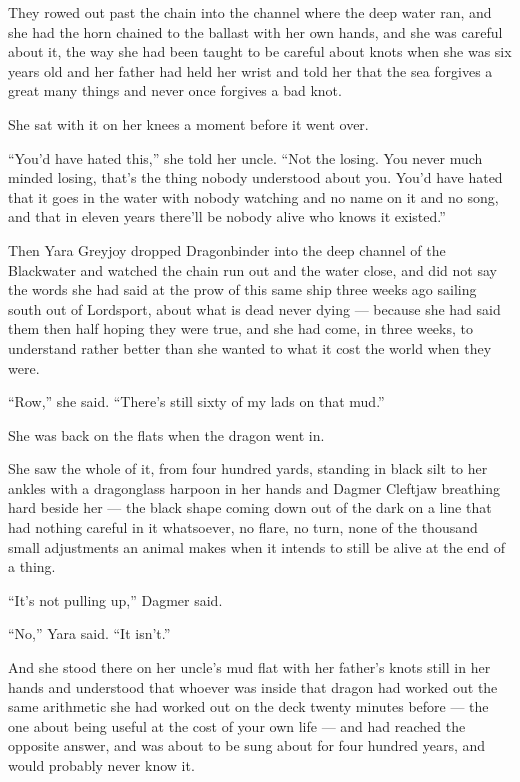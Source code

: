They rowed out past the chain into the channel where the deep water ran, and she had the horn chained to the ballast with her own hands, and she was careful about it, the way she had been taught to be careful about knots when she was six years old and her father had held her wrist and told her that the sea forgives a great many things and never once forgives a bad knot.

She sat with it on her knees a moment before it went over.

“You’d have hated this,” she told her uncle. “Not the losing. You never much minded losing, that’s the thing nobody understood about you. You’d have hated that it goes in the water with nobody watching and no name on it and no song, and that in eleven years there’ll be nobody alive who knows it existed.”

Then Yara Greyjoy dropped Dragonbinder into the deep channel of the Blackwater and watched the chain run out and the water close, and did not say the words she had said at the prow of this same ship three weeks ago sailing south out of Lordsport, about what is dead never dying — because she had said them then half hoping they were true, and she had come, in three weeks, to understand rather better than she wanted to what it cost the world when they were.

“Row,” she said. “There’s still sixty of my lads on that mud.”

\sceneBreak

She was back on the flats when the dragon went in.

She saw the whole of it, from four hundred yards, standing in black silt to her ankles with a dragonglass harpoon in her hands and Dagmer Cleftjaw breathing hard beside her — the black shape coming down out of the dark on a line that had nothing careful in it whatsoever, no flare, no turn, none of the thousand small adjustments an animal makes when it intends to still be alive at the end of a thing.

“It’s not pulling up,” Dagmer said.

“No,” Yara said. “It isn’t.”

And she stood there on her uncle’s mud flat with her father’s knots still in her hands and understood that whoever was inside that dragon had worked out the same arithmetic she had worked out on the deck twenty minutes before — the one about being useful at the cost of your own life — and had reached the opposite answer, and was about to be sung about for four hundred years, and would probably never know it.